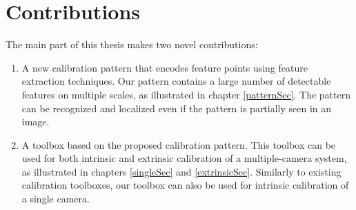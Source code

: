 \documentclass{report}
\begin{document}
\section{Contributions}

The main part of this thesis makes two novel contributions: 

\begin{enumerate}
\item A new calibration pattern that encodes feature points using feature extraction techniques. Our pattern contains a large number of detectable features on multiple scales, as illustrated in chapter \ref{patternSec}. The pattern can be recognized and localized even if the pattern is partially seen in an image. 
\item A toolbox based on the proposed calibration pattern. This toolbox can be used for both intrinsic and extrinsic calibration of a multiple-camera system, as illustrated in chapters \ref{singleSec} and \ref{extrinsicSec}. Similarly to existing calibration toolboxes, our toolbox can also be used for intrinsic calibration of a single camera. 
\end{enumerate}
\end{document}
